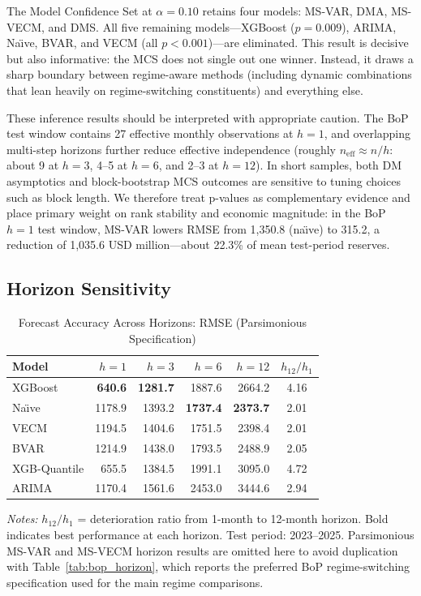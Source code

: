 \documentclass[12pt,a4paper]{article}
\begin{document}
The Model Confidence Set at $\alpha = 0.10$ retains four models: MS-VAR, DMA, MS-VECM, and DMS. All five remaining models---XGBoost ($p = 0.009$), ARIMA, Na\"{\i}ve, BVAR, and VECM (all $p < 0.001$)---are eliminated. This result is decisive but also informative: the MCS does not single out one winner. Instead, it draws a sharp boundary between regime-aware methods (including dynamic combinations that lean heavily on regime-switching constituents) and everything else.

These inference results should be interpreted with appropriate caution. The BoP test window contains 27 effective monthly observations at $h=1$, and overlapping multi-step horizons further reduce effective independence (roughly $n_{\text{eff}} \approx n/h$: about 9 at $h=3$, 4--5 at $h=6$, and 2--3 at $h=12$). In short samples, both DM asymptotics and block-bootstrap MCS outcomes are sensitive to tuning choices such as block length. We therefore treat p-values as complementary evidence and place primary weight on rank stability and economic magnitude: in the BoP $h=1$ test window, MS-VAR lowers RMSE from 1,350.8 (na\"{\i}ve) to 315.2, a reduction of 1,035.6 USD million---about 22.3\% of mean test-period reserves.

\subsection{Horizon Sensitivity}

\begin{table}[htbp]
\centering
\caption{Forecast Accuracy Across Horizons: RMSE (Parsimonious Specification)}
\label{tab:horizon}
\begin{tabular}{lrrrrc}
\toprule
Model & $h = 1$ & $h = 3$ & $h = 6$ & $h = 12$ & $h_{12}/h_1$ \\
\midrule
XGBoost & \textbf{640.6} & \textbf{1281.7} & 1887.6 & 2664.2 & 4.16 \\
Na\"{\i}ve & 1178.9 & 1393.2 & \textbf{1737.4} & \textbf{2373.7} & 2.01 \\
VECM & 1194.5 & 1404.6 & 1751.5 & 2398.4 & 2.01 \\
BVAR & 1214.9 & 1438.0 & 1793.5 & 2488.9 & 2.05 \\
XGB-Quantile & 655.5 & 1384.5 & 1991.1 & 3095.0 & 4.72 \\
ARIMA & 1170.4 & 1561.6 & 2453.0 & 3444.6 & 2.94 \\
\bottomrule
\end{tabular}
\begin{tablenotes}
\small
\item \textit{Notes:} $h_{12}/h_1$ = deterioration ratio from 1-month to 12-month horizon. Bold indicates best performance at each horizon. Test period: 2023--2025. Parsimonious MS-VAR and MS-VECM horizon results are omitted here to avoid duplication with Table~\ref{tab:bop_horizon}, which reports the preferred BoP regime-switching specification used for the main regime comparisons.
\end{tablenotes}
\end{table}
\end{document}
